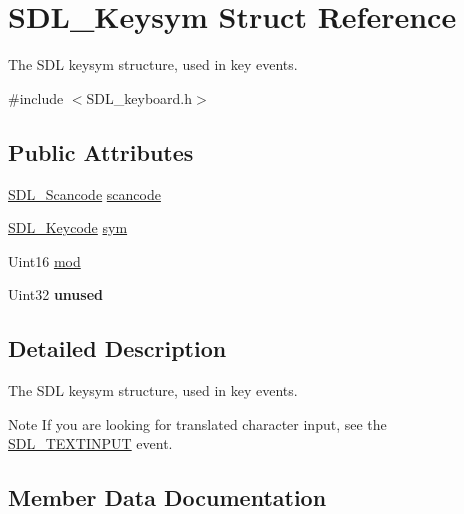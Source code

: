 \hypertarget{structSDL__Keysym}{}\section{S\+D\+L\+\_\+\+Keysym Struct Reference}
\label{structSDL__Keysym}


The S\+DL keysym structure, used in key events.  




{\ttfamily \#include $<$S\+D\+L\+\_\+keyboard.\+h$>$}

\subsection*{Public Attributes}
\begin{DoxyCompactItemize}
\item 
\hyperlink{SDL__scancode_8h_a82ab7cff701034fb40a47b5b3a02777b}{S\+D\+L\+\_\+\+Scancode} \hyperlink{structSDL__Keysym_ad47e9120a511e2efc7ec0c6d8a5ec51e}{scancode}
\item 
\hyperlink{SDL__keycode_8h_ae9265f064f13f0f74dfca26a67875171}{S\+D\+L\+\_\+\+Keycode} \hyperlink{structSDL__Keysym_a082ff1fd787b79fa6c3a445deb225f08}{sym}
\item 
Uint16 \hyperlink{structSDL__Keysym_ab519d1b8a9939d3d035f7103f3208291}{mod}
\item 
\mbox{\label{structSDL__Keysym_ab1d0a50cc619966fb06b92e15cc46dd9}} 
Uint32 {\bfseries unused}
\end{DoxyCompactItemize}


\subsection{Detailed Description}
The S\+DL keysym structure, used in key events. 

\begin{DoxyNote}{Note}
If you are looking for translated character input, see the \hyperlink{SDL__events_8h_a3b589e89be6b35c02e0dd34a55f3fccaa4fa2570088f6b9cbd109ae91b511368f}{S\+D\+L\+\_\+\+T\+E\+X\+T\+I\+N\+P\+UT} event. 
\end{DoxyNote}


\subsection{Member Data Documentation}
\mbox{\label{structSDL__Keysym_ab519d1b8a9939d3d035f7103f3208291}} 

